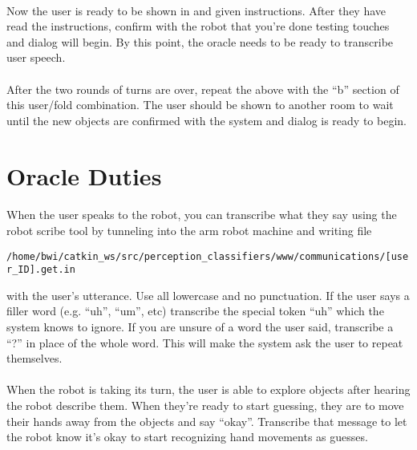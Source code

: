 \documentclass{article}
\begin{document}
\paragraph{} Now the user is ready to be shown in and given instructions. After they have read the instructions, confirm with the robot that you're done testing touches and dialog will begin. By this point, the oracle needs to be ready to transcribe user speech.

\paragraph{} After the two rounds of turns are over, repeat the above with the ``b'' section of this user/fold combination. The user should be shown to another room to wait until the new objects are confirmed with the system and dialog is ready to begin.

\section{Oracle Duties}

\paragraph{} When the user speaks to the robot, you can transcribe what they say using the robot scribe tool by tunneling into the arm robot machine and writing file

\texttt{/home/bwi/catkin\_ws/src/perception\_classifiers/www/communications/[user\_ID].get.in} 

with the user's utterance. Use all lowercase and no punctuation. If the user says a filler word (e.g. ``uh'', ``um'', etc) transcribe the special token ``uh'' which the system knows to ignore. If you are unsure of a word the user said, transcribe a ``?'' in place of the whole word. This will make the system ask the user to repeat themselves.

\paragraph{} When the robot is taking its turn, the user is able to explore objects after hearing the robot describe them. When they're ready to start guessing, they are to move their hands away from the objects and say ``okay''. Transcribe that message to let the robot know it's okay to start recognizing hand movements as guesses.
\end{document}
